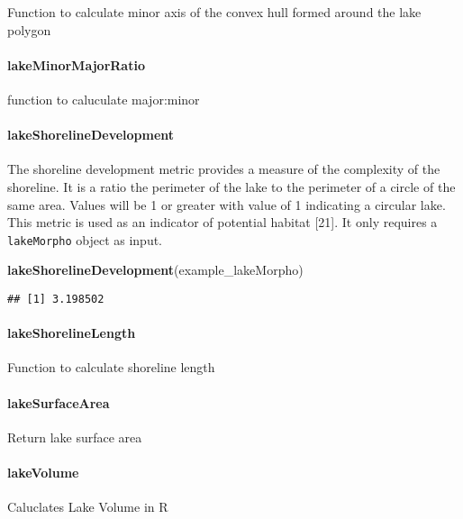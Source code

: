 \documentclass[11pt,]{article}
\newenvironment{Shaded}{\begin{snugshade}}{\end{snugshade}}
\newcommand{\KeywordTok}[1]{\textcolor[rgb]{0.13,0.29,0.53}{\textbf{{#1}}}}
\newcommand{\NormalTok}[1]{{#1}}
\begin{document}
Function to calculate minor axis of the convex hull formed around the
lake polygon

\paragraph{lakeMinorMajorRatio}\label{lakeminormajorratio}

function to caluculate major:minor

\paragraph{lakeShorelineDevelopment}\label{lakeshorelinedevelopment}

The shoreline development metric provides a measure of the complexity of
the shoreline. It is a ratio the perimeter of the lake to the perimeter
of a circle of the same area. Values will be 1 or greater with value of
1 indicating a circular lake. This metric is used as an indicator of
potential habitat {[}21{]}. It only requires a \texttt{lakeMorpho}
object as input.

\begin{Shaded}
\begin{Highlighting}[]
\KeywordTok{lakeShorelineDevelopment}\NormalTok{(example_lakeMorpho)}
\end{Highlighting}
\end{Shaded}

\begin{verbatim}
## [1] 3.198502
\end{verbatim}

\paragraph{lakeShorelineLength}\label{lakeshorelinelength}

Function to calculate shoreline length

\paragraph{lakeSurfaceArea}\label{lakesurfacearea}

Return lake surface area

\paragraph{lakeVolume}\label{lakevolume}

Caluclates Lake Volume in R
\end{document}
